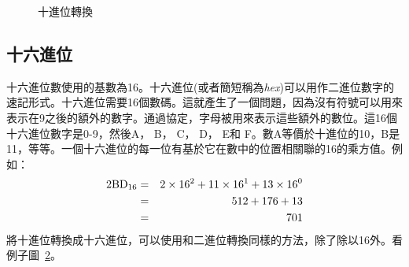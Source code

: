 \begin{figure}[t]
\centering
{}
\caption{十進位轉換\label{fig:dec-convert}}
\end{figure}

\subsection{十六進位}

十六進位數使用的基數為16。十六進位(或者簡短稱為\emph{hex})可以用作二進位數字的速記形式。十六進位需要16個數碼。這就產生了一個問題，因為沒有符號可以用來表示在9之後的額外的數字。通過協定，字母被用來表示這些額外的數位。這16個十六進位數字是0-9，然後A，
B， C， D， E和
F。數A等價於十進位的10，B是11，等等。一個十六進位的每一位有基於它在數中的位置相關聯的16的乘方值。例如：
\begin{eqnarray*}
\rm
2BD_{16} & = & 2 \times 16^2 + 11 \times 16^1 + 13 \times 16^0 \\
         & = & 512 + 176 + 13 \\
         & = & 701 \\
\end{eqnarray*}
將十進位轉換成十六進位，可以使用和二進位轉換同樣的方法，除了除以16外。看例子圖~\ref{fig:hex-conv}。

\begin{figure}[t]
\centering
{}
\caption{\label{fig:hex-conv}}
\end{figure}

